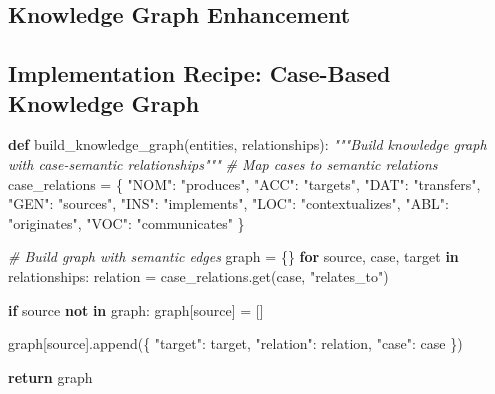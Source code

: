 \documentclass[
  11pt,
  letterpaper,
]{article}
\newenvironment{Shaded}{}{}
\newcommand{\CommentTok}[1]{\textcolor[rgb]{0.38,0.63,0.69}{\textit{#1}}}
\newcommand{\ControlFlowTok}[1]{\textcolor[rgb]{0.00,0.44,0.13}{\textbf{#1}}}
\newcommand{\KeywordTok}[1]{\textcolor[rgb]{0.00,0.44,0.13}{\textbf{#1}}}
\newcommand{\NormalTok}[1]{#1}
\newcommand{\OperatorTok}[1]{\textcolor[rgb]{0.40,0.40,0.40}{#1}}
\newcommand{\StringTok}[1]{\textcolor[rgb]{0.25,0.44,0.63}{#1}}
\begin{document}
\hypertarget{knowledge-graph-enhancement}{%
\subsection{Knowledge Graph
Enhancement}\label{knowledge-graph-enhancement}}

\hypertarget{implementation-recipe-case-based-knowledge-graph}{%
\subsection{Implementation Recipe: Case-Based Knowledge
Graph}\label{implementation-recipe-case-based-knowledge-graph}}

\begin{Shaded}
\begin{Highlighting}[]
\KeywordTok{def}\NormalTok{ build\_knowledge\_graph(entities, relationships):}
    \CommentTok{"""Build knowledge graph with case{-}semantic relationships"""}
    \CommentTok{\# Map cases to semantic relations}
\NormalTok{    case\_relations }\OperatorTok{=}\NormalTok{ \{}
        \StringTok{"NOM"}\NormalTok{: }\StringTok{"produces"}\NormalTok{, }\StringTok{"ACC"}\NormalTok{: }\StringTok{"targets"}\NormalTok{, }
        \StringTok{"DAT"}\NormalTok{: }\StringTok{"transfers"}\NormalTok{, }\StringTok{"GEN"}\NormalTok{: }\StringTok{"sources"}\NormalTok{,}
        \StringTok{"INS"}\NormalTok{: }\StringTok{"implements"}\NormalTok{, }\StringTok{"LOC"}\NormalTok{: }\StringTok{"contextualizes"}\NormalTok{,}
        \StringTok{"ABL"}\NormalTok{: }\StringTok{"originates"}\NormalTok{, }\StringTok{"VOC"}\NormalTok{: }\StringTok{"communicates"}
\NormalTok{    \}}
    
    \CommentTok{\# Build graph with semantic edges}
\NormalTok{    graph }\OperatorTok{=}\NormalTok{ \{\}}
    \ControlFlowTok{for}\NormalTok{ source, case, target }\KeywordTok{in}\NormalTok{ relationships:}
\NormalTok{        relation }\OperatorTok{=}\NormalTok{ case\_relations.get(case, }\StringTok{"relates\_to"}\NormalTok{)}
        
        \ControlFlowTok{if}\NormalTok{ source }\KeywordTok{not} \KeywordTok{in}\NormalTok{ graph:}
\NormalTok{            graph[source] }\OperatorTok{=}\NormalTok{ []}
            
\NormalTok{        graph[source].append(\{}
            \StringTok{"target"}\NormalTok{: target,}
            \StringTok{"relation"}\NormalTok{: relation,}
            \StringTok{"case"}\NormalTok{: case}
\NormalTok{        \})}
    
    \ControlFlowTok{return}\NormalTok{ graph}
\end{Highlighting}
\end{Shaded}
\end{document}
